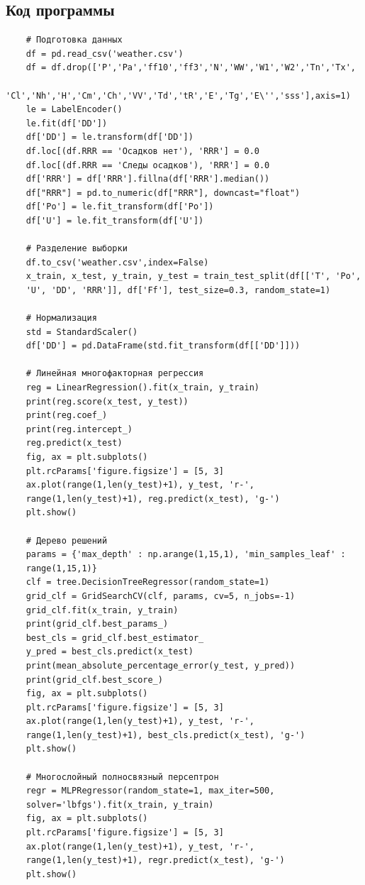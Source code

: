 \documentclass[12pt,a4paper]{scrartcl}
\begin{document}
	\subsection{Код программы}
	\label{sec:exp:code}
	\begin{verbatim}
	# Подготовка данных
	df = pd.read_csv('weather.csv')
	df = df.drop(['P','Pa','ff10','ff3','N','WW','W1','W2','Tn','Tx',
	'Cl','Nh','H','Cm','Ch','VV','Td','tR','E','Tg','E\'','sss'],axis=1)
	le = LabelEncoder()
	le.fit(df['DD'])
	df['DD'] = le.transform(df['DD'])
	df.loc[(df.RRR == 'Осадков нет'), 'RRR'] = 0.0
	df.loc[(df.RRR == 'Следы осадков'), 'RRR'] = 0.0
	df['RRR'] = df['RRR'].fillna(df['RRR'].median())
	df["RRR"] = pd.to_numeric(df["RRR"], downcast="float")
	df['Po'] = le.fit_transform(df['Po'])
	df['U'] = le.fit_transform(df['U'])
	
	# Разделение выборки
	df.to_csv('weather.csv',index=False)
	x_train, x_test, y_train, y_test = train_test_split(df[['T', 'Po',
	'U', 'DD', 'RRR']], df['Ff'], test_size=0.3, random_state=1)
	
	# Нормализация
	std = StandardScaler()
	df['DD'] = pd.DataFrame(std.fit_transform(df[['DD']]))
	
	# Линейная многофакторная регрессия
	reg = LinearRegression().fit(x_train, y_train)
	print(reg.score(x_test, y_test))
	print(reg.coef_)
	print(reg.intercept_)
	reg.predict(x_test)
	fig, ax = plt.subplots()
	plt.rcParams['figure.figsize'] = [5, 3]
	ax.plot(range(1,len(y_test)+1), y_test, 'r-',
	range(1,len(y_test)+1), reg.predict(x_test), 'g-')
	plt.show()
	
	# Дерево решений
	params = {'max_depth' : np.arange(1,15,1), 'min_samples_leaf' :
	range(1,15,1)}
	clf = tree.DecisionTreeRegressor(random_state=1)
	grid_clf = GridSearchCV(clf, params, cv=5, n_jobs=-1)
	grid_clf.fit(x_train, y_train)
	print(grid_clf.best_params_)
	best_cls = grid_clf.best_estimator_
	y_pred = best_cls.predict(x_test)
	print(mean_absolute_percentage_error(y_test, y_pred))
	print(grid_clf.best_score_)
	fig, ax = plt.subplots()
	plt.rcParams['figure.figsize'] = [5, 3]
	ax.plot(range(1,len(y_test)+1), y_test, 'r-',
	range(1,len(y_test)+1), best_cls.predict(x_test), 'g-')
	plt.show()
	
	# Многослойный полносвязный персептрон
	regr = MLPRegressor(random_state=1, max_iter=500,
	solver='lbfgs').fit(x_train, y_train)
	fig, ax = plt.subplots()
	plt.rcParams['figure.figsize'] = [5, 3]
	ax.plot(range(1,len(y_test)+1), y_test, 'r-',
	range(1,len(y_test)+1), regr.predict(x_test), 'g-')
	plt.show()
	
	\end{verbatim}
	
\end{document}
